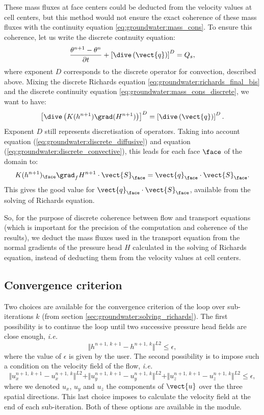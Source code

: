 These mass fluxes at face centers could be deducted from the velocity values at cell centers, but this method would not ensure the exact
coherence of these mass fluxes with the continuity equation \eqref{eq:groundwater:mass_cons}.
To ensure this coherence, let us write the discrete contnuity equation:
\begin{equation}
 \label{eq:groundwater:mass_cons_discrete}
\frac{\theta^{n+1}-\theta^n}{\partial t} + \left[ \dive \left( \vect{q} \right) \right]^D = Q_s,
\end{equation}
where exponent $D$ corresponds to the discrete operator for convection, described above.
Mixing the discrete Richards equation \eqref{eq:groundwater:richards_final_bis} and the discrete continuity equation \eqref{eq:groundwater:mass_cons_discrete}, we want to have:
\begin{equation}
 \label{eq:groundwater:discrete_egality}
\left[ \dive \left( K(h^{n+1}) \grad(H^{n+1}) \right) \right]^D = \left[ \dive \left( \vect{q} \right) \right]^D.
\end{equation}
Exponent $D$ still represents discretisation of operators.
Taking into account equation (\eqref{eq:groundwater:discrete_diffusive}) and equation (\eqref{eq:groundwater:discrete_convective}), this leads for each face $\face$ of the domain to:
\begin{equation}
 \label{eq:groundwater:verification}
K(h^{n+1})_\face \grad_f H^{n+1}\cdot \vect{S}_\face = \vect{q}_\face \cdot \vect{S}_\face.
\end{equation}
This gives the good value for $\vect{q}_\face\cdot \vect{S}_\face$, available from the solving of Richards equation.

So, for the purpose of discrete coherence between flow and transport equations (which is important for the precision of the computation and coherence of the results), we deduct the mass fluxes
used in the transport equation from the normal gradients of the pressure head $H$ calculated in the solving of
Richards equation, instead of deducting them from the velocity values at cell centers.

\subsection{Convergence criterion}
Two choices are available for the convergence criterion of the loop over sub-iterations $k$ (from section \ref{sec:groundwater:solving_richards}).
The first possibility is to continue the loop until two successive pressure head fields are close enough, \emph{i.e.}
$$\Vert h^{n + 1, \ k + 1} - h^{n + 1, \ k } \Vert^{L2} \leq \epsilon,$$
where the value of $\epsilon$ is given by the user.
The second possibility is to impose such a condition on the velocity field of the flow, \emph{i.e.}
$$\Vert u_x^{n + 1, \ k + 1} - u_x^{n + 1, \ k } \Vert^{L2}
+ \Vert u_y^{n + 1, \ k + 1} - u_y^{n + 1, \ k } \Vert^{L2}
+ \Vert u_z^{n + 1, \ k + 1} - u_z^{n + 1, \ k } \Vert^{L2} \leq \epsilon,$$
where we denoted $u_x$, $u_y$ and $u_z$ the components of $\vect{u}$ over the three spatial directions.
This last choice imposes to calculate the velocity field at the end of each sub-iteration.
Both of these options are available in the module.

